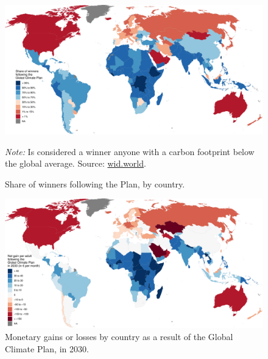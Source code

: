 \documentclass[a5paper,english,openany]{memoir}
\begin{document}
\clearpage
\begin{figure}[h] %
  \caption[Share of winners by country]{Share of winners following the Plan, by country.}\label{fig:share_below_global_mean}
  \centerline{
    \includegraphics[width=.8\paperwidth]{../figures/maps/share_below_global_mean_en.pdf}
    } 
 {\footnotesize \textit{Note:} Is considered a winner anyone with a carbon footprint below the global average. Source: \href{http://wid.world}{wid.world}.
 }
\end{figure} 
\begin{figure}[h] %
  \caption[Net gains by country in 2030]{Monetary gains or losses by country as a result of the Global Climate Plan, in 2030.}\label{fig:gain_2030}
  \centerline{\includegraphics[width=.8\paperwidth]{../figures/maps/gain_adj_2030.pdf}}  \vspace{-3cm}
\end{figure}
\end{document}
